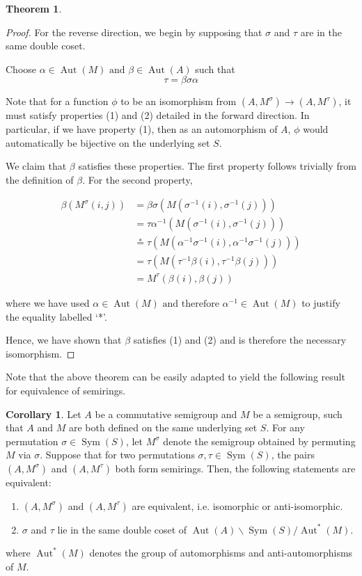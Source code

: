 \documentclass{article}
\theoremstyle{definition}
\newtheorem{theorem}{Theorem}
\newtheorem{cor}{Corollary}
\begin{document}
\begin{theorem}
\begin{proof}
    \vspace{2em}
    For the reverse direction, we begin by supposing that \(\sigma\) and \(\tau\) are in the same double coset.

    Choose \(\alpha\in\operatorname{Aut}(M)\text{ and } \beta\in\operatorname{Aut}(A)\) such that 
    \[\tau=\beta\sigma\alpha\]

    Note that for a function \(\phi\) to be an isomorphism from \((A,M^\sigma)\to(A, M^\tau)\), it must satisfy properties (1) and (2) detailed in the forward direction. In particular, if we have property (1), then as an automorphism of \(A\), \(\phi\) would automatically be bijective on the underlying set \(S\).

    We claim that \(\beta\) satisfies these properties. The first property follows trivially from the definition of \(\beta\). For the second property, 

    \begin{align*}
        \beta(M^\sigma(i,j))&=\beta\sigma(M(\sigma^{-1}(i),\sigma^{-1}(j)))\\
        &=\tau\alpha^{-1}(M(\sigma^{-1}(i),\sigma^{-1}(j)))\\
        &\overset{*}{=}\tau(M(\alpha^{-1}\sigma^{-1}(i),\alpha^{-1}\sigma^{-1}(j)))\\
        &=\tau(M(\tau^{-1}\beta(i),\tau^{-1}\beta(j)))\\
        &=M^\tau(\beta(i),\beta(j))
    \end{align*}

    where we have used \(\alpha\in\operatorname{Aut}(M)\text{ and therefore }\alpha^{-1}\in\operatorname{Aut}(M)\) to justify the equality labelled `*'.

    Hence, we have shown that \(\beta\) satisfies (1) and (2) and is therefore the necessary isomorphism.
\end{proof}
\end{theorem}

Note that the above theorem can be easily adapted to yield the following result for equivalence of semirings.
\begin{cor}
    \label{cor:equiv-condition}
    Let \(A\) be a commutative semigroup and \(M\) be a semigroup, such that \(A\) and \(M\) are both defined on the same underlying set \(S\). For any permutation \(\sigma \in \operatorname{Sym}(S)\), let \(M^\sigma\) denote the semigroup obtained by permuting \(M\) via \(\sigma\). Suppose that for two permutations \(\sigma, \tau\in\operatorname{Sym}(S)\), the pairs \((A,M^\sigma)\) and \((A,M^\tau)\) both form semirings. Then, the following statements are equivalent:
    \begin{enumerate}
        \item \((A, M^\sigma)\) and \((A, M^\tau)\) are equivalent, i.e. isomorphic or anti-isomorphic.
        \item \(\sigma\) and \(\tau\) lie in the same double coset of \(\operatorname{Aut}(A) \backslash \operatorname{Sym}(S) / \operatorname{Aut}^*(M)\).
    \end{enumerate}
    where \(\operatorname{Aut}^*(M)\) denotes the group of automorphisms and anti-automorphisms of \(M\).
\end{cor}
\end{document}
